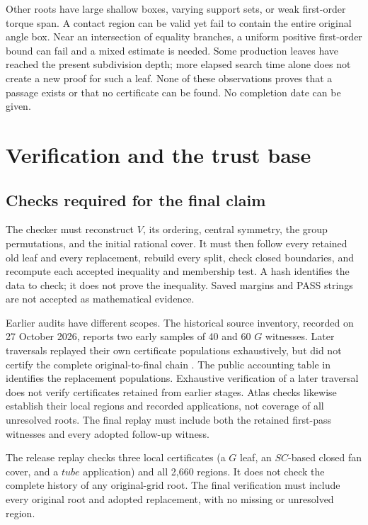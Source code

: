 \documentclass[11pt]{amsart}
\newcommand{\file}[1]{\path{#1}}
\theoremstyle{definition}
\theoremstyle{remark}
\begin{document}
Other roots have large shallow boxes, varying support sets, or weak
first-order torque span. A contact region can be valid yet fail to contain
the entire original angle box. Near an intersection of equality branches,
a uniform positive first-order bound can fail and a mixed estimate is
needed. Some production leaves have reached the present subdivision
depth; more elapsed search time alone does not create a new proof for
such a leaf. None of these observations proves that a passage exists or
that no certificate can be found. No completion date can be given.

\section{Verification and the trust base}\label{sec:verification}

\subsection{Checks required for the final claim}
The checker must reconstruct $V$, its ordering, central symmetry, the
group permutations, and the initial rational cover. It must then follow
every retained old leaf and every replacement, rebuild every split,
check closed boundaries, and recompute each accepted inequality and
membership test. A hash identifies the data to check; it does not prove
the inequality. Saved margins and PASS strings are not accepted as
mathematical evidence.

Earlier audits have different scopes. The historical source inventory,
recorded on 27 October 2026, reports two early samples of 40 and 60 $G$
witnesses. Later traversals replayed their own certificate populations
exhaustively, but did not certify the complete original-to-final chain
\cite{map}. The public accounting table in
\file{data/historical-accounting.md} identifies the replacement
populations. Exhaustive verification of a later traversal does not verify
certificates retained from earlier stages. Atlas checks likewise establish
their local regions and recorded applications, not coverage of all
unresolved roots. The final replay must include both the retained
first-pass witnesses and every adopted follow-up witness.

The release replay checks three local certificates (a $G$ leaf, an
$SC$-based closed fan cover, and a $tube$ application) and all 2,660
regions. It does not check the complete history of any original-grid
root. The final verification must include every original root and adopted
replacement, with no missing or unresolved region.
\end{document}

